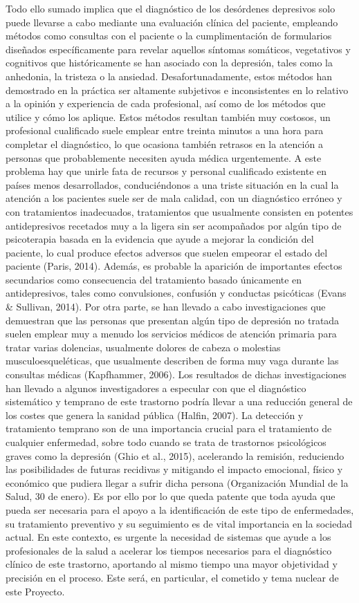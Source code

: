 Todo ello sumado implica que el diagnóstico de los desórdenes depresivos solo puede llevarse a cabo mediante una evaluación clínica del paciente, empleando métodos como consultas con el paciente o la cumplimentación de formularios diseñados específicamente para revelar aquellos síntomas somáticos, vegetativos y cognitivos que históricamente se han asociado con la depresión, tales como la anhedonia, la tristeza o la ansiedad. Desafortunadamente, estos métodos han demostrado en la práctica ser altamente subjetivos e inconsistentes en lo relativo a la opinión y experiencia de cada profesional, así como de los métodos que utilice y cómo los aplique. Estos métodos resultan también muy costosos, un profesional cualificado suele emplear entre treinta minutos a una hora para completar el diagnóstico, lo que ocasiona también retrasos en la atención a personas que probablemente necesiten ayuda médica urgentemente.
A este problema hay que unirle fata de recursos y personal cualificado existente en países menos desarrollados, conduciéndonos a una triste situación en la cual la atención a los pacientes suele ser de mala calidad, con un diagnóstico erróneo y con tratamientos inadecuados, tratamientos que usualmente consisten en potentes antidepresivos recetados muy a la ligera sin ser acompañados por algún tipo de psicoterapia basada en la evidencia que ayude a mejorar la condición del paciente, lo cual produce efectos adversos que suelen empeorar el estado del paciente (Paris, 2014). Además, es probable la aparición de importantes efectos secundarios como consecuencia del tratamiento basado únicamente en antidepresivos, tales como convulsiones, confusión y conductas psicóticas (Evans \& Sullivan, 2014).
Por otra parte, se han llevado a cabo investigaciones que demuestran que las personas que presentan algún tipo de depresión no tratada suelen emplear muy a menudo los servicios médicos de atención primaria para tratar varias dolencias, usualmente dolores de cabeza o molestias musculoesqueléticas, que usualmente describen de forma muy vaga durante las consultas médicas (Kapfhammer, 2006). Los resultados de dichas investigaciones han llevado a algunos investigadores a especular con que el diagnóstico sistemático y temprano de este trastorno podría llevar a una reducción general de los costes que genera la sanidad pública (Halfin, 2007).
La detección y tratamiento temprano son de una importancia crucial para el tratamiento de cualquier enfermedad, sobre todo cuando se trata de trastornos psicológicos graves como la depresión (Ghio et al., 2015), acelerando la remisión, reduciendo las posibilidades de futuras recidivas y mitigando el impacto emocional, físico y económico que pudiera llegar a sufrir dicha persona (Organización Mundial de la Salud, 30 de enero).
Es por ello por lo que queda patente que toda ayuda que pueda ser necesaria para el apoyo a la identificación de este tipo de enfermedades, su tratamiento preventivo y su seguimiento es de vital importancia en la sociedad actual. En este contexto, es urgente la necesidad de sistemas que ayude a los profesionales de la salud a acelerar los tiempos necesarios para el diagnóstico clínico de este trastorno, aportando al mismo tiempo una mayor objetividad y precisión en el proceso. Este será, en particular, el cometido y tema nuclear de este Proyecto.

